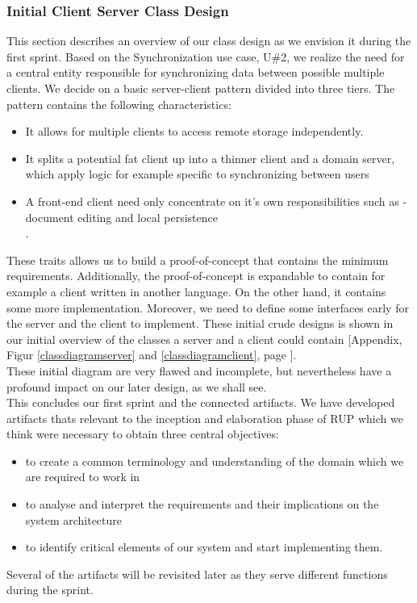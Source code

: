 \subsubsection{Initial Client Server Class Design}
This section describes an overview of our class design as we envision it during the first sprint. Based on the Synchronization use case, U\#2, we realize the need for a central entity responsible for synchronizing data between possible multiple clients. We decide on a basic server-client pattern divided into three tiers. The pattern contains the following characteristics:\\
\begin{itemize}
\item It allows for multiple clients to access remote storage independently.
\item It splits a potential fat client up into a thinner client and a domain server, which apply logic for example specific to synchronizing between users
\item A front-end client need only concentrate on it's own responsibilities such as - document editing and local persistence \cite{ttda}\\.
\end{itemize}

These traits allows us to build a proof-of-concept that contains the minimum requirements. Additionally, the proof-of-concept is expandable to contain for example a client written in another language. On the other hand, it contains some more implementation. Moreover, we need to define some interfaces early for the server and the client to implement. These initial crude designs is shown in our initial overview of the classes a server and a client could contain [Appendix, Figur \ref{classdiagramserver} and \ref{classdiagramclient}, page \pageref{classdiagramserver}].\\
These initial diagram are very flawed and incomplete, but nevertheless have a profound impact on our later design, as we shall see.\\
\newline
This concludes our first sprint and the connected artifacts. We have developed artifacts thats relevant to the inception and elaboration phase of RUP which we think were necessary to obtain three central objectives:\\
\begin{itemize}
\item to create a common terminology and understanding of the domain which we are required to work in
\item to analyse and interpret the requirements and their implications on the system architecture
\item to identify critical elements of our system and start implementing them.
\end{itemize}
Several of the artifacts will be revisited later as they serve different functions during the sprint.\\